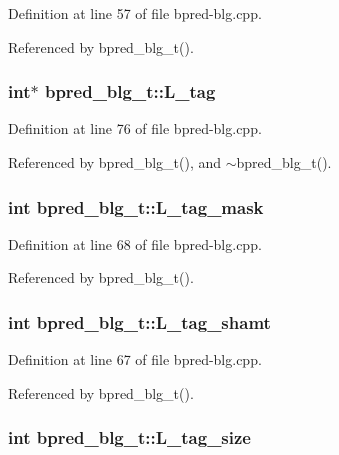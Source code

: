 Definition at line 57 of file bpred-blg.cpp.

Referenced by bpred\_\-blg\_\-t().
\subsubsection[{L\_\-tag}]{\setlength{\rightskip}{0pt plus 5cm}int$\ast$ {\bf bpred\_\-blg\_\-t::L\_\-tag}\hspace{0.3cm}{\tt  [protected]}}\label{classbpred__blg__t_9a684b84f37e6fca0817adc6fb33d8e5}




Definition at line 76 of file bpred-blg.cpp.

Referenced by bpred\_\-blg\_\-t(), and $\sim$bpred\_\-blg\_\-t().
\subsubsection[{L\_\-tag\_\-mask}]{\setlength{\rightskip}{0pt plus 5cm}int {\bf bpred\_\-blg\_\-t::L\_\-tag\_\-mask}\hspace{0.3cm}{\tt  [protected]}}\label{classbpred__blg__t_e7be66b5283542fd40cc022c2a95ee98}




Definition at line 68 of file bpred-blg.cpp.

Referenced by bpred\_\-blg\_\-t().
\subsubsection[{L\_\-tag\_\-shamt}]{\setlength{\rightskip}{0pt plus 5cm}int {\bf bpred\_\-blg\_\-t::L\_\-tag\_\-shamt}\hspace{0.3cm}{\tt  [protected]}}\label{classbpred__blg__t_e8737fda14b68ee9698d13b98dff1a2e}




Definition at line 67 of file bpred-blg.cpp.

Referenced by bpred\_\-blg\_\-t().
\subsubsection[{L\_\-tag\_\-size}]{\setlength{\rightskip}{0pt plus 5cm}int {\bf bpred\_\-blg\_\-t::L\_\-tag\_\-size}\hspace{0.3cm}{\tt  [protected]}}\label{classbpred__blg__t_4460533b7bc5e3ba2117fb62a10399dc}




